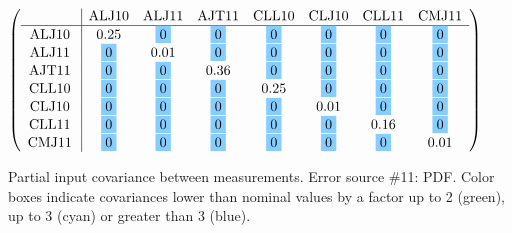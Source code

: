 \begin{table}[H]
\scriptsize
\begin{center}
\renewcommand{\arraystretch}{1.1}
\begin{math}\left(\begin{array}{c|ccccccc}
 & \mathrm{ALJ10} & 
\mathrm{ALJ11} & 
\mathrm{AJT11} & 
\mathrm{CLL10} & 
\mathrm{CLJ10} & 
\mathrm{CLL11} & 
\mathrm{CMJ11} \\
\hline
\mathrm{ALJ10} \hspace*{2pt} &       0.25 &  \colorbox{SkyBlue1}{$ 0$} &  \colorbox{SkyBlue1}{$ 0$} &  \colorbox{SkyBlue1}{$ 0$} &  \colorbox{SkyBlue1}{$ 0$} &  \colorbox{SkyBlue1}{$ 0$} &  \colorbox{SkyBlue1}{$ 0$} \\
\mathrm{ALJ11} \hspace*{2pt} &  \colorbox{SkyBlue1}{$ 0$} &       0.01 &  \colorbox{SkyBlue1}{$ 0$} &  \colorbox{SkyBlue1}{$ 0$} &  \colorbox{SkyBlue1}{$ 0$} &  \colorbox{SkyBlue1}{$ 0$} &  \colorbox{SkyBlue1}{$ 0$} \\
\mathrm{AJT11} \hspace*{2pt} &  \colorbox{SkyBlue1}{$ 0$} &  \colorbox{SkyBlue1}{$ 0$} &       0.36 &  \colorbox{SkyBlue1}{$ 0$} &  \colorbox{SkyBlue1}{$ 0$} &  \colorbox{SkyBlue1}{$ 0$} &  \colorbox{SkyBlue1}{$ 0$} \\
\mathrm{CLL10} \hspace*{2pt} &  \colorbox{SkyBlue1}{$ 0$} &  \colorbox{SkyBlue1}{$ 0$} &  \colorbox{SkyBlue1}{$ 0$} &       0.25 &  \colorbox{SkyBlue1}{$ 0$} &  \colorbox{SkyBlue1}{$ 0$} &  \colorbox{SkyBlue1}{$ 0$} \\
\mathrm{CLJ10} \hspace*{2pt} &  \colorbox{SkyBlue1}{$ 0$} &  \colorbox{SkyBlue1}{$ 0$} &  \colorbox{SkyBlue1}{$ 0$} &  \colorbox{SkyBlue1}{$ 0$} &       0.01 &  \colorbox{SkyBlue1}{$ 0$} &  \colorbox{SkyBlue1}{$ 0$} \\
\mathrm{CLL11} \hspace*{2pt} &  \colorbox{SkyBlue1}{$ 0$} &  \colorbox{SkyBlue1}{$ 0$} &  \colorbox{SkyBlue1}{$ 0$} &  \colorbox{SkyBlue1}{$ 0$} &  \colorbox{SkyBlue1}{$ 0$} &       0.16 &  \colorbox{SkyBlue1}{$ 0$} \\
\mathrm{CMJ11} \hspace*{2pt} &  \colorbox{SkyBlue1}{$ 0$} &  \colorbox{SkyBlue1}{$ 0$} &  \colorbox{SkyBlue1}{$ 0$} &  \colorbox{SkyBlue1}{$ 0$} &  \colorbox{SkyBlue1}{$ 0$} &  \colorbox{SkyBlue1}{$ 0$} &       0.01 \\
\end{array}\right)\end{math}
\caption{Partial input covariance between measurements. Error source \#11: PDF. Color boxes indicate covariances lower than nominal values by a factor up to 2 (green), up to 3 (cyan) or greater than 3 (blue).}
\renewcommand{\arraystretch}{1}
\end{center}
\end{table}
